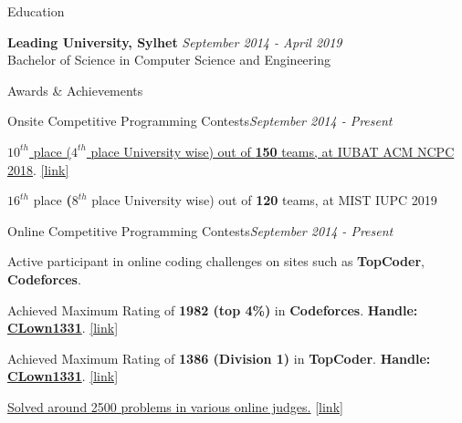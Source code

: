 \documentclass{resume}
\begin{document}

\begin{rSection}{Education}

{\bf Leading University, Sylhet} \hfill {\em September 2014 - April 2019}
\\ Bachelor of Science in Computer Science and Engineering
\end{rSection}



\begin{rSection}{Awards \& Achievements} 

\begin{rSubsection}{Onsite Competitive Programming Contests}{\em September 2014 - Present}{}{}{}
\item \href{https://icpc.baylor.edu/ICPCID/DII3NHEO8O8I}{\textbf{$10^{th}$} place (\textbf{$4^{th}$} place University wise) out of \textbf{150} teams, at IUBAT ACM NCPC 2018}. \href{https://icpc.baylor.edu/ICPCID/DII3NHEO8O8I}{[link]}
\item \textbf{$16^{th}$} place \textbf(\textbf{$8^{th}$} place University wise) out of \textbf{120} teams, at MIST IUPC 2019
\end{rSubsection}

\begin{rSubsection}{Online Competitive Programming Contests}{\em September 2014 - Present}{}{}{}
\item Active participant in online coding challenges on sites such as \textbf{TopCoder}, \textbf{Codeforces}.
\item Achieved Maximum Rating of \textbf{1982 (top 4\%)} in \textbf{Codeforces}. \textbf{Handle:} \textbf{\href{http://codeforces.com/profile/CLown1331}{CLown1331}}. \href{http://codeforces.com/profile/CLown1331}{[link]}
\item Achieved Maximum Rating of \textbf{1386 (Division 1)} in \textbf{TopCoder}. \textbf{Handle:} \textbf{\href{https://www.topcoder.com/members/CLown1331/}{CLown1331}}. \href{https://www.topcoder.com/members/CLown1331/}{[link]}
\item \href{https://www.stopstalk.com/user/profile/clown1331}{Solved around 2500 problems in various online judges.} \href{https://www.stopstalk.com/user/profile/clown1331}{[link]}
\end{rSubsection}

\end{rSection}
\end{document}
